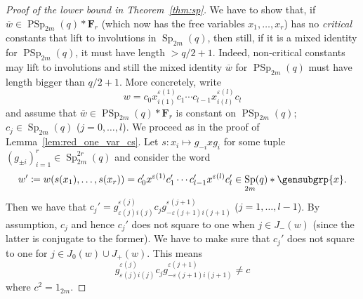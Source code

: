 \documentclass[a4paper,11pt]{amsproc}
\DeclareMathOperator{\Sp}{Sp}%
\DeclareMathOperator{\PSp}{PSp}%
\newcommand{\freegrp}{\mathbf F}%
\theoremstyle{plain}
\theoremstyle{definition}
\begin{document}
	\begin{proof}[Proof of the lower bound in Theorem~\ref{thm:sp}]
		We have to show that, if $\overline{w}\in\PSp_{2m}(q)\ast\freegrp_r$ (which now has the free variables $x_1,\ldots,x_r$) has no \emph{critical} constants that lift to involutions in $\Sp_{2m}(q)$, then still, if it is a mixed identity for $\PSp_{2m}(q)$, it must have length $>q/2+1$.
		Indeed, non-critical constants may lift to involutions and still the mixed identity $\overline{w}$ for $\PSp_{2m}(q)$ must have length bigger than $q/2+1$. More concretely, write 
		$$
		w=c_0x_{i(1)}^{\varepsilon(1)}c_1\cdots c_{l-1} x_{i(l)}^{\varepsilon(l)}c_l
		$$ 
		and assume that $\overline{w}\in\PSp_{2m}(q)\ast\freegrp_r$ is constant on $\PSp_{2m}(q)$; $c_j\in\Sp_{2m}(q)$ ($j=0,\ldots,l$). We proceed as in the proof of Lemma~\ref{lem:red_one_var_cs}. Let $s\colon x_i\mapsto g_{-i} x g_i$ for some tuple $(g_{\pm i})_{i=1}^r\in\Sp_{2m}^{2r}(q)$ and consider the word 
		$$
		w'\coloneqq w(s(x_1),\ldots,s(x_r))=c_0' x^{\varepsilon(1)} c_1' \cdots c_{l-1}' x^{\varepsilon(l)} c_l'\in\Sp_{2m}(q)\ast\gensubgrp{x}.
		$$ 
		Then we have that $c_j'=g_{\varepsilon(j) i(j)}^{\varepsilon(j)}c_j g_{-\varepsilon(j+1) i(j+1)}^{\varepsilon(j+1)}$ ($j=1,\ldots,l-1$). By assumption, $c_j$ and hence $c_j'$ does not square to one when $j\in J_-(w)$ (since the latter is conjugate to the former). We have to make sure that $c_j'$ does not square to one for $j\in J_0(w)\cup J_+(w)$. This means 
		\begin{equation}\label{eq:ilgl_consts}
			g_{\varepsilon(j) i(j)}^{\varepsilon(j)}c_j g_{-\varepsilon(j+1) i(j+1)}^{\varepsilon(j+1)}\neq c
		\end{equation} 
		where $c^2=1_{2m}$. 
		

\end{proof}
\end{document}
